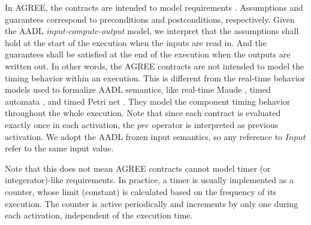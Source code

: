 
%

In AGREE, the contracts are intended to model requirements \cite{AGREE2}. Assumptions and guarantees correspond to preconditions and postconditions, respectively. Given the AADL \emph{input-compute-output} model, we interpret that the assumptions shall hold at the start of the execution when the inputs are read in. And the guarantees shall be satisfied at the end of the execution when the outputs are written out. In other words, the AGREE contracts are not intended to model the timing behavior within an execution. This is different from the real-time behavior models used to formalize AADL semantics, like real-time Maude \cite{maude}, timed automata \cite{behaviorannex}, and timed Petri net \cite{tpn}. They model the component timing behavior throughout the whole execution. Note that since each contract is evaluated exactly once in each activation, the $pre$ operator is interpreted as previous activation. We adopt the AADL frozen input semantics, so any reference to $Input$ refer to the same input value.

Note that this does not mean AGREE contracts cannot model timer (or integerator)-like requirements. In practice, a timer is usually implemented as a counter, whose limit (constant) is calculated based on the frequency of its execution. The counter is active periodically and increments by only one during each activation, independent of the execution time. 

